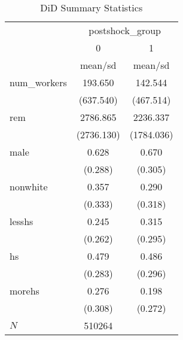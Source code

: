 \begin{table}[htbp]\centering
\def\sym#1{\ifmmode^{#1}\else\(^{#1}\)\fi}
\caption{DiD Summary Statistics}
\begin{tabular}{l*{2}{c}}
\hline\hline
            &\multicolumn{2}{c}{postshock\_group}\\
            &           0&           1\\
            &     mean/sd&     mean/sd\\
\hline
num\_workers &     193.650&     142.544\\
            &   (637.540)&   (467.514)\\
rem         &    2786.865&    2236.337\\
            &  (2736.130)&  (1784.036)\\
male        &       0.628&       0.670\\
            &     (0.288)&     (0.305)\\
nonwhite    &       0.357&       0.290\\
            &     (0.333)&     (0.318)\\
lesshs      &       0.245&       0.315\\
            &     (0.262)&     (0.295)\\
hs          &       0.479&       0.486\\
            &     (0.283)&     (0.296)\\
morehs      &       0.276&       0.198\\
            &     (0.308)&     (0.272)\\
\hline
\(N\)       &      510264&            \\
\hline\hline
\end{tabular}
\end{table}
